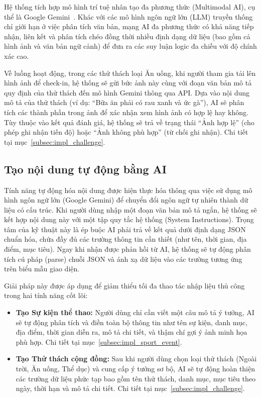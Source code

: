 Hệ thống tích hợp mô hình trí tuệ nhân tạo đa phương thức (Multimodal AI), cụ thể là Google Gemini~\cite{GeminiAPIDocs}. Khác với các mô hình ngôn ngữ lớn (LLM) truyền thống chỉ giới hạn ở việc phân tích văn bản, mạng AI đa phương thức có khả năng tiếp nhận, liên kết và phân tích chéo đồng thời nhiều định dạng dữ liệu (bao gồm cả hình ảnh và văn bản ngữ cảnh) để đưa ra các suy luận logic đa chiều với độ chính xác cao.

Về luồng hoạt động, trong các thử thách loại Ăn uống, khi người tham gia tải lên hình ảnh để check-in, hệ thống sẽ gửi bức ảnh này cùng với đoạn văn bản mô tả quy định của thử thách đến mô hình Gemini thông qua API. Dựa vào nội dung mô tả của thử thách (ví dụ: ``Bữa ăn phải có rau xanh và ức gà''), AI sẽ phân tích các thành phần trong ảnh để xác nhận xem hình ảnh có hợp lệ hay không. Tùy thuộc vào kết quả đánh giá, hệ thống sẽ trả về trạng thái ``Ảnh hợp lệ'' (cho phép ghi nhận tiến độ) hoặc ``Ảnh không phù hợp'' (từ chối ghi nhận). Chi tiết tại mục~\ref{subsec:impl_challenge}.

\subsection{Tạo nội dung tự động bằng AI}
\label{subsec:impl_ai_auto_content}

Tính năng tự động hóa nội dung được hiện thực hóa thông qua việc sử dụng mô hình ngôn ngữ lớn (Google Gemini) để chuyển đổi ngôn ngữ tự nhiên thành dữ liệu có cấu trúc. Khi người dùng nhập một đoạn văn bản mô tả ngắn, hệ thống sẽ kết hợp nội dung này với một tập quy tắc hệ thống (System Instructions). Trọng tâm của kỹ thuật này là ép buộc AI phải trả về kết quả dưới định dạng JSON chuẩn hóa, chứa đầy đủ các trường thông tin cần thiết (như tên, thời gian, địa điểm, mục tiêu). Ngay khi nhận được phản hồi từ AI, hệ thống sẽ tự động phân tích cú pháp (parse) chuỗi JSON và ánh xạ dữ liệu vào các trường tương ứng trên biểu mẫu giao diện.

Giải pháp này được áp dụng để giảm thiểu tối đa thao tác nhập liệu thủ công trong hai tính năng cốt lõi:

\begin{itemize}
    \item \textbf{Tạo Sự kiện thể thao:} Người dùng chỉ cần viết một câu mô tả ý tưởng, AI sẽ tự động phân tích và điền toàn bộ thông tin như tên sự kiện, danh mục, địa điểm, thời gian diễn ra, mô tả chi tiết, và thậm chí gợi ý ảnh minh họa phù hợp. Chi tiết tại mục~\ref{subsec:impl_sport_event}.
    \item \textbf{Tạo Thử thách cộng đồng:} Sau khi người dùng chọn loại thử thách (Ngoài trời, Ăn uống, Thể dục) và cung cấp ý tưởng sơ bộ, AI sẽ tự động hoàn thiện các trường dữ liệu phức tạp bao gồm tên thử thách, danh mục, mục tiêu theo ngày, thời hạn và mô tả chi tiết. Chi tiết tại mục~\ref{subsec:impl_challenge}.
\end{itemize}

